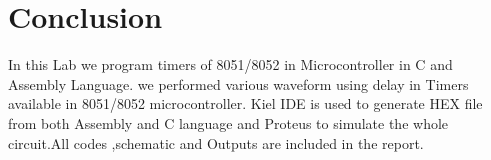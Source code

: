 \documentclass{article}
\begin{document}

\section{Conclusion}

In this Lab we program timers of 8051/8052 in Microcontroller in C and Assembly Language. we performed various waveform using delay in Timers available in 8051/8052 microcontroller. Kiel IDE is used to generate HEX file from both Assembly and C language and Proteus to simulate the whole circuit.All codes ,schematic and Outputs are included in the report.
\end{document}
